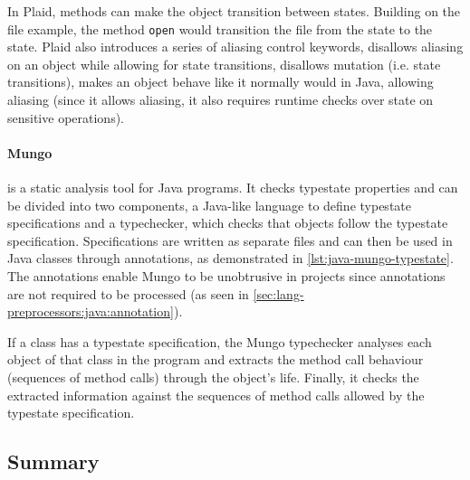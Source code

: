 In Plaid, methods can make the object transition between states. Building on the file example,
the method \texttt{open} would transition the file from the  state to the  state.
Plaid also introduces a series of aliasing control keywords,
 disallows aliasing on an object while allowing for state transitions,
 disallows mutation (i.e. state transitions),
 makes an object behave like it normally would in Java,
allowing aliasing (since it allows aliasing, it also requires runtime checks over state on sensitive operations).

\paragraph{Mungo} is a static analysis tool \autocite{Dardha2017, Kouzapas2018, Voinea2020} for Java programs.
It checks typestate properties and can be divided into two components, a Java-like language to define typestate specifications
and a typechecker, which checks that objects follow the typestate specification.
Specifications are written as separate files and can then be used in Java classes through annotations, as demonstrated in \autoref{lst:java-mungo-typestate}.
The annotations enable Mungo to be unobtrusive in projects since annotations are not required to be processed (as seen in \autoref{sec:lang-preprocessors:java:annotation}).
\begin{displayquote}
	If a class has a typestate specification, the Mungo typechecker analyses each object of that class in the program and extracts the method call behaviour (sequences of method calls) through
	the object’s life. Finally, it checks the extracted information against the sequences of method calls allowed by the typestate specification.
\end{displayquote}



\subsection{Summary}

